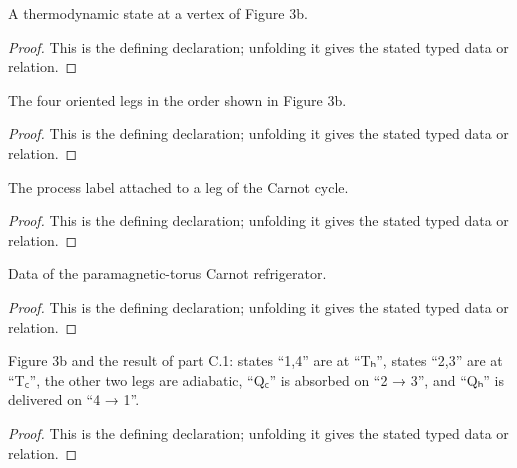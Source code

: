 \begin{definition}[TorusState]
  \label{decl:physics:IPhO_2026_3_C_2:TorusState}
  A thermodynamic state at a vertex of Figure 3b.
\end{definition}
\begin{proof}
  This is the defining declaration; unfolding it gives the stated typed data or relation.
\end{proof}

\begin{definition}[CycleLeg]
  \label{decl:physics:IPhO_2026_3_C_2:CycleLeg}
  The four oriented legs in the order shown in Figure 3b.
\end{definition}
\begin{proof}
  This is the defining declaration; unfolding it gives the stated typed data or relation.
\end{proof}

\begin{definition}[ProcessKind]
  \label{decl:physics:IPhO_2026_3_C_2:ProcessKind}
  The process label attached to a leg of the Carnot cycle.
\end{definition}
\begin{proof}
  This is the defining declaration; unfolding it gives the stated typed data or relation.
\end{proof}

\begin{definition}[CarnotCycle]
  \label{decl:physics:IPhO_2026_3_C_2:CarnotCycle}
  Data of the paramagnetic-torus Carnot refrigerator.
\end{definition}
\begin{proof}
  This is the defining declaration; unfolding it gives the stated typed data or relation.
\end{proof}

\begin{definition}
  \label{decl:physics:IPhO_2026_3_C_2:Figure3bReadout}
  Figure 3b and the result of part C.1: states “1,4” are at “Tₕ”, states “2,3” are at “T꜀”, the other two legs are adiabatic, “Q꜀” is absorbed on “2 → 3”, and “Qₕ” is delivered on “4 → 1”.
\end{definition}
\begin{proof}
  This is the defining declaration; unfolding it gives the stated typed data or relation.
\end{proof}


